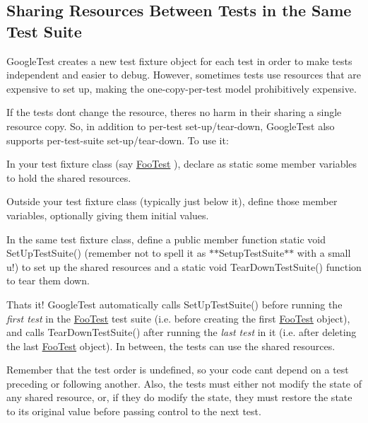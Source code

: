 \subsection*{Sharing Resources Between Tests in the Same Test Suite}

Google\+Test creates a new test fixture object for each test in order to make tests independent and easier to debug. However, sometimes tests use resources that are expensive to set up, making the one-\/copy-\/per-\/test model prohibitively expensive.

If the tests don\textquotesingle{}t change the resource, there\textquotesingle{}s no harm in their sharing a single resource copy. So, in addition to per-\/test set-\/up/tear-\/down, Google\+Test also supports per-\/test-\/suite set-\/up/tear-\/down. To use it\+:


\begin{DoxyEnumerate}
\item In your test fixture class (say {\ttfamily \mbox{\hyperlink{classFooTest}{Foo\+Test}}} ), declare as {\ttfamily static} some member variables to hold the shared resources.
\item Outside your test fixture class (typically just below it), define those member variables, optionally giving them initial values.
\item In the same test fixture class, define a public member function {\ttfamily static void Set\+Up\+Test\+Suite()} (remember not to spell it as $\ast$$\ast${\ttfamily Setup\+Test\+Suite}$\ast$$\ast$ with a small {\ttfamily u}!) to set up the shared resources and a {\ttfamily static void Tear\+Down\+Test\+Suite()} function to tear them down.
\end{DoxyEnumerate}

That\textquotesingle{}s it! Google\+Test automatically calls {\ttfamily Set\+Up\+Test\+Suite()} before running the {\itshape first test} in the {\ttfamily \mbox{\hyperlink{classFooTest}{Foo\+Test}}} test suite (i.\+e. before creating the first {\ttfamily \mbox{\hyperlink{classFooTest}{Foo\+Test}}} object), and calls {\ttfamily Tear\+Down\+Test\+Suite()} after running the {\itshape last test} in it (i.\+e. after deleting the last {\ttfamily \mbox{\hyperlink{classFooTest}{Foo\+Test}}} object). In between, the tests can use the shared resources.

Remember that the test order is undefined, so your code can\textquotesingle{}t depend on a test preceding or following another. Also, the tests must either not modify the state of any shared resource, or, if they do modify the state, they must restore the state to its original value before passing control to the next test.


